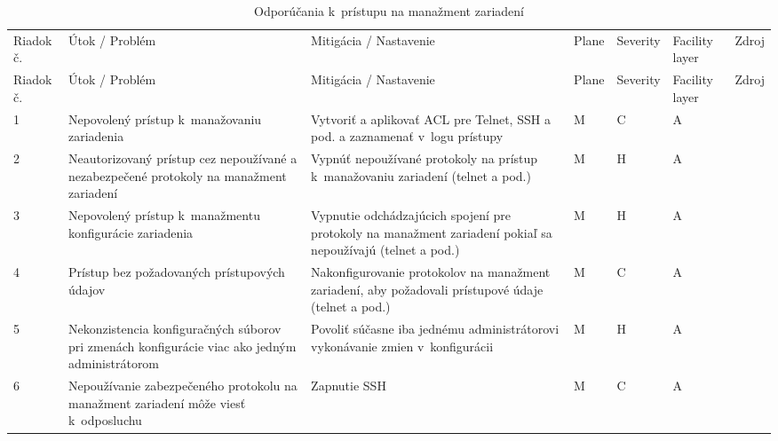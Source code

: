 
\newpage


\footnotesize
{}

\begin{longtable}[!htbp]{|C{2.5em}L{11em}L{11em}C{2.5em}C{4em}C{5em}L{2.5em}|}
	\caption{Odporúčania k~prístupu na manažment zariadení}
	\label{tab:managemnet}\\ \hline
	\mbox{Riadok} č.&Útok / Problém	&Mitigácia / Nastavenie	& Plane 	&Severity	&Facility layer	&Zdroj\\ \hhline{=======}
	\endfirsthead 
	\hline
	\centering
	
	Riadok č.	&Útok / Problém	&Mitigácia / Nastavenie	&Plane	&Severity	&Facility layer	&Zdroj\\ \hhline{=======}
	\endhead
	
	 1	&Nepovolený prístup k~manažovaniu zariadenia	&Vytvoriť a aplikovať ACL pre Telnet, SSH a pod. a zaznamenať v~logu prístupy	&M	&C	&A	& \cite{Akin2002}
	
	\cite{CIS_DrTLsgXv24lxeIIM}	\\
	2	&Neautorizovaný prístup cez nepoužívané a nezabezpečené protokoly na manažment zariadení	&Vypnúť nepoužívané protokoly na prístup k~manažovaniu zariadení (telnet a pod.)	&M	&H	&A	& \cite{CIS_DrTLsgXv24lxeIIM}
	
	\cite{Singh2018}
	\\
	 3	&Nepovolený prístup k~manažmentu konfigurácie zariadenia	&Vypnutie odchádzajúcich spojení pre protokoly na manažment zariadení pokiaľ sa nepoužívajú (telnet a pod.)	&M	&H	&A	& \cite{Singh2018}	\\
	4	&Prístup bez požadovaných prístupových údajov	&Nakonfigurovanie protokolov na manažment zariadení, aby požadovali prístupové údaje (telnet a pod.)	&M	&C	&A	& \cite{CIS_DrTLsgXv24lxeIIM}	\\
	 5	&Nekonzistencia konfiguračných súborov pri zmenách konfigurácie viac ako jedným administrátorom	&Povoliť súčasne iba jednému administrátorovi vykonávanie zmien v~konfigurácii	&M	&H	&A	& \cite{Singh2018}	\\
	6	&Nepoužívanie zabezpečeného protokolu na manažment zariadení môže viesť k~odposluchu	&Zapnutie SSH	&M	&C	&A	& \cite{CIS_DrTLsgXv24lxeIIM}
	

\end{longtable}
